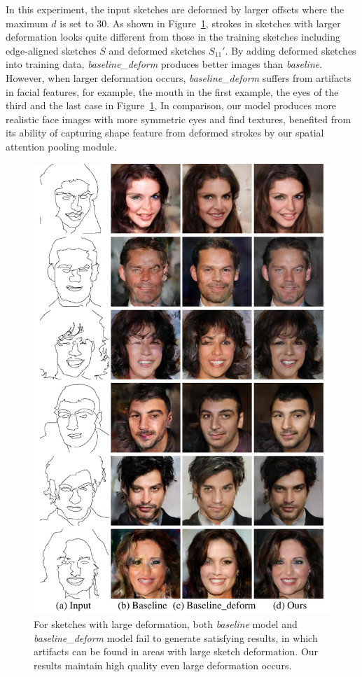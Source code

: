 In this experiment, the input sketches are deformed by larger offsets where the maximum $d$ is set to $30$. 
As shown in Figure~\ref{fig:generalization_examples}, strokes in sketches with larger deformation looks quite different from those in the training sketches including edge-aligned sketches $S$ and deformed sketches $S_{11}'$. 
%
By adding deformed sketches into training data, \textit{baseline\_deform} produces better images than \textit{baseline}. However, when larger deformation occurs, \textit{baseline\_deform} suffers from artifacts in facial features, for example, the mouth in the first example, the eyes of the third and the last case in Figure~\ref{fig:generalization_examples}, 
In comparison, our model produces more realistic face images with more symmetric eyes and find textures, benefited from its ability of capturing shape feature from deformed strokes by our spatial attention pooling module. 
\begin{figure}
	\includegraphics[width=0.9\linewidth]{figs/generalization_examples}
	\caption{For sketches with large deformation, both \textit{baseline} model and \textit{baseline\_deform} model fail to generate satisfying results, in which artifacts can be found in areas with large sketch deformation. Our results maintain high quality even large deformation occurs.  }
	\label{fig:generalization_examples}
\end{figure}

